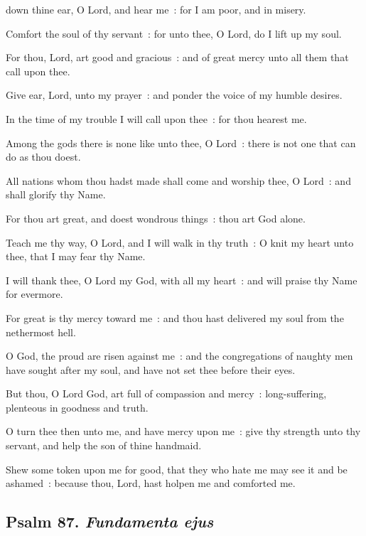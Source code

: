  down thine ear, O Lord, and hear me~: for I am poor, and in misery.\par
{}
Comfort the soul of thy servant~: for unto thee, O Lord, do I lift up my soul.\par
{}For thou, Lord, art good and gracious~: and of great mercy unto all them that call upon thee.\par
{}Give ear, Lord, unto my prayer~: and ponder the voice of my humble desires.\par
{}In the time of my trouble I will call upon thee~: for thou hearest me.\par
{}Among the gods there is none like unto thee, O Lord~: there is not one that can do as thou doest.\par
{}All nations whom thou hadst made shall come and worship thee, O Lord~: and shall glorify thy Name.\par
{}For thou art great, and doest wondrous things~: thou art God alone.\par
{}Teach me thy way, O Lord, and I will walk in thy truth~: O knit my heart unto thee, that I may fear thy Name.\par
{}I will thank thee, O Lord my God, with all my heart~: and will praise thy Name for evermore.\par
{}For great is thy mercy toward me~: and thou hast delivered my soul from the nethermost hell.\par
{}O God, the proud are risen against me~: and the congregations of naughty men have sought after my soul, and have not set thee before their eyes.\par
{}But thou, O Lord God, art full of compassion and mercy~: long-suffering, plenteous in goodness and truth.\par
{}O turn thee then unto me, and have mercy upon me~: give thy strength unto thy servant, and help the son of thine handmaid.\par
{}Shew some token upon me for good, that they who hate me may see it and be ashamed~: because thou, Lord, hast holpen me and comforted me.\par

\subsection{Psalm 87. \textit{Fundamenta ejus}}


